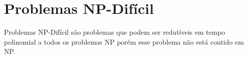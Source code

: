 \section{Problemas NP-Difícil}
Problemas NP-Difícil são problemas que podem ser redutíveis em tempo polinomial a todos os problemas NP porém esse problema não está contido em NP.

